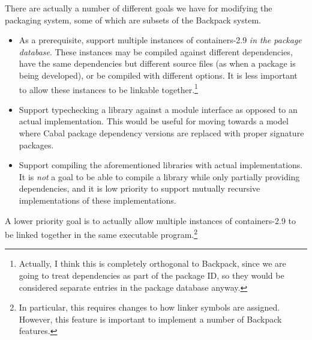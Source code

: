 \documentclass{article}
\begin{document}
There are actually a number of different goals we have for modifying the
packaging system, some of which are subsets of the Backpack system.

\begin{itemize}
    \item As a prerequisite, support multiple instances of containers-2.9 \emph{in the
        package database}.  These instances may be compiled against
        different dependencies, have the same dependencies but different
        source files (as when a package is being developed), or be
        compiled with different options.  It is less important to allow
        these instances to be linkable together.\footnote{Actually, I think
        this is completely orthogonal to Backpack, since we are going to treat
        dependencies as part of the package ID, so they would be considered
        separate entries in the package database anyway.}

    \item Support typechecking a library against a module interface
        as opposed to an actual implementation.  This would be useful
        for moving towards a model where Cabal package dependency versions
        are replaced with proper signature packages. %

    \item Support compiling the aforementioned libraries with actual implementations.
        It is \emph{not} a goal to be able to compile a library while only
        partially providing dependencies, and it is low priority to support
        mutually recursive implementations of these implementations.

\end{itemize}

A lower priority goal is to actually allow multiple instances of
containers-2.9 to be linked together in the same executable
program.\footnote{In particular, this requires changes to how linker
symbols are assigned. However, this feature is important to
implement a number of Backpack features.}
\end{document}
